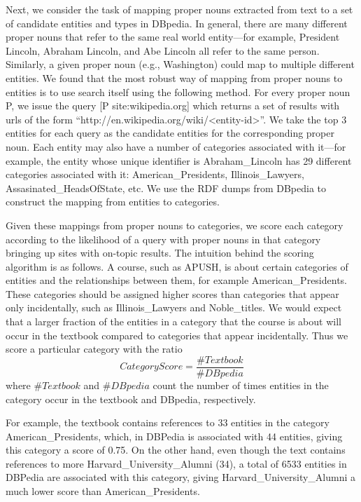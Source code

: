 \documentclass[pdfpagelabels=false,plainpages=true]{acm_proc_article-sp}
\begin{document}
Next, we consider the task of mapping proper nouns extracted from text
to a set of candidate entities and types in DBpedia. In general, there are many
different proper nouns that refer to the same real world entity---for example,
President Lincoln, Abraham Lincoln, and Abe Lincoln all refer to the same 
person. Similarly, a given proper noun (e.g., Washington) could map to multiple
different entities. We found that the most robust way of mapping from proper
nouns to entities is to use search itself using the following method. For every
proper noun P, we issue the query [P site:wikipedia.org] which returns a set of
results with urls of the form ``http://\-en.wikipedia.org/wiki/<entity-id>''. We take
the top 3 entities for each query as the candidate entities for the corresponding
proper noun. Each entity may also have a number of categories associated with it---for  
example, the entity whose unique identifier is Abraham\_Lincoln has 29
different categories associated with it: American\_Presidents,
Illinois\_Lawyers, Assasinated\_HeadsOfState, etc. We use the RDF dumps from
DBpedia to construct the mapping from entities to categories.

Given these mappings from proper nouns to categories, we score each category
according to the likelihood of a query with proper nouns in that category
bringing up sites with on-topic results. The intuition behind the
scoring algorithm is as follows. A course, such as APUSH, is about certain
categories of entities and the relationships between them, for example
American\_Presidents. These categories should be assigned higher scores than
categories that appear only incidentally, such as Illinois\_Lawyers and
Noble\_titles. We would expect that a larger fraction of the entities in a
category that the course is about will occur in the textbook compared to
categories that appear incidentally. Thus we score a particular category with
the ratio
\begin{equation}
CategoryScore = \frac{\#Textbook}{\#DBpedia}
\end{equation}
where $\#Textbook$ and $\#DBpedia$ count the number of times entities in
the category occur in the textbook and DBpedia, respectively.

For example, the textbook contains references to 33 entities in the category
American\_Presidents, which, in DBPedia is associated with 44 entities, giving
this category a score of 0.75. On the other hand, even though the text contains
references to more Harvard\_University\_Alumni (34), a total of 6533 entities in
DBPedia are associated with this category, giving Harvard\_University\_Alumni a
much lower score than American\_Presidents. 
\end{document}
